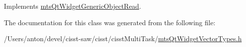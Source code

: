 Implements \hyperlink{classmts_qt_widget_generic_object_read_ade3ec733d27e14609b2f95831a389658}{mts\+Qt\+Widget\+Generic\+Object\+Read}.



The documentation for this class was generated from the following file\+:\begin{DoxyCompactItemize}
\item 
/\+Users/anton/devel/cisst-\/saw/cisst/cisst\+Multi\+Task/\hyperlink{mts_qt_widget_vector_types_8h}{mts\+Qt\+Widget\+Vector\+Types.\+h}\end{DoxyCompactItemize}
